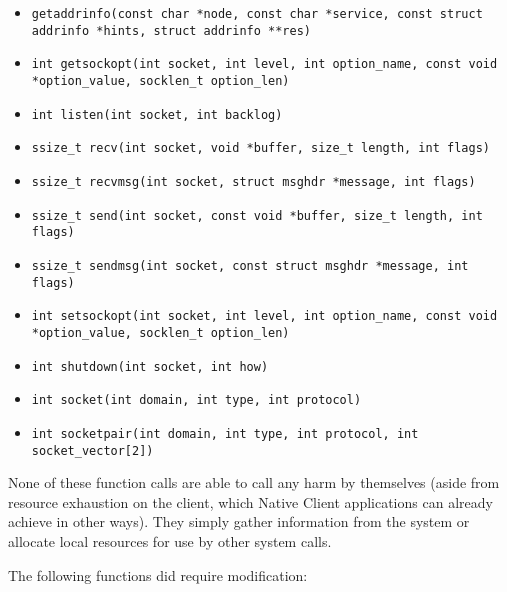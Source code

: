 \documentclass[a4paper,10pt]{article}
\begin{document}
\begin{itemize}
\item \texttt{getaddrinfo(const char *node,
                const char *service,
                const struct addrinfo *hints,
                struct addrinfo **res)}
\item \texttt{int getsockopt(int socket, int level, int option\_name, const void
                *option\_value, socklen\_t option\_len)}
\item \texttt{int listen(int socket, int backlog)}
\item \texttt{ssize\_t recv(int socket, void *buffer, size\_t length, int
flags)}
\item \texttt{ssize\_t recvmsg(int socket, struct msghdr *message, int flags)}
\item \texttt{ssize\_t send(int socket, const void *buffer, size\_t length, int
flags)}
\item \texttt{ssize\_t sendmsg(int socket, const struct msghdr *message, int
flags)}
\item \texttt{int setsockopt(int socket, int level, int option\_name, const void
                *option\_value, socklen\_t option\_len)}
\item \texttt{int shutdown(int socket, int how)}
\item \texttt{int socket(int domain, int type, int protocol)}
\item \texttt{int socketpair(int domain, int type, int protocol,
       int socket\_vector[2])}
\end{itemize}

None of these function calls are able to call any harm by themselves (aside
from resource exhaustion on the client, which Native Client applications can
already achieve in other ways).  They simply gather information from the system
or allocate local resources for use by other system calls.

The following functions did require modification:
\end{document}
